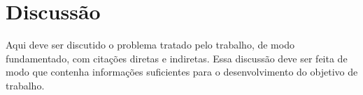 \section{Discussão}

    Aqui deve ser discutido o problema tratado pelo trabalho, de modo fundamentado,
    com citações diretas e indiretas. Essa discussão deve ser feita de modo que
    contenha informações suficientes para o desenvolvimento do objetivo de trabalho.